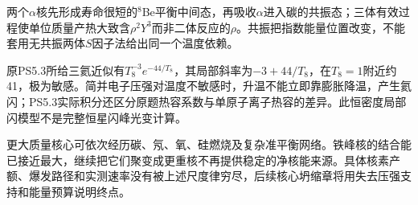 两个$\alpha$核先形成寿命很短的$^8$Be平衡中间态，再吸收$\alpha$进入碳的共振态；三体有效过程使单位质量产热大致含$\rho^2Y^3$而非二体反应的$\rho$。共振把指数能量位置改变，不能套用无共振两体$S$因子法给出同一个温度依赖。

原PS5.3所给三氦近似有$T_8^{-3}e^{-44/T_8}$，其局部斜率为$-3+44/T_8$，在$T_8=1$附近约41，极为敏感。简并电子压强对温度不敏感时，升温不能立即靠膨胀降温，产生氦闪；PS5.3实际积分还区分原题热容系数与单原子离子热容的差异。此恒密度局部闪模型不是完整恒星闪峰光变计算。

更大质量核心可依次经历碳、氖、氧、硅燃烧及复杂准平衡网络。铁峰核的结合能已接近最大，继续把它们聚变成更重核不再提供稳定的净核能来源。具体核素产额、爆发路径和实测速率没有被上述尺度律穷尽，后续核心坍缩章将用失去压强支持和能量预算说明终点。
